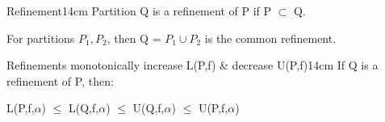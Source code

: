     \vspace{0.5cm}

    

    \begin{definition}{Refinement}{14cm}
        Partition Q is a refinement of P if P $\subset$ Q.

        For partitions $P_1, P_2$, then Q = $P_1 \cup P_2$ is the common refinement.
    \end{definition}

    \newpage



    \begin{wtheorem}{Refinements monotonically increase L(P,f) \& decrease U(P,f)}{14cm}
        If Q is a refinement of P, then:

        \hspace{1cm}
        L(P,f,$\alpha$) $\leq$ L(Q,f,$\alpha$)
        $\leq$ U(Q,f,$\alpha$) $\leq$ U(P,f,$\alpha$)
    \end{wtheorem}

